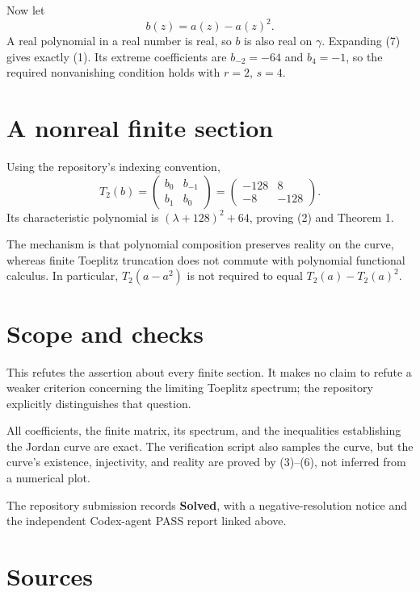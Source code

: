 \documentclass[10pt,a4paper]{article}
\begin{document}
Now let \[
 b(z)=a(z)-a(z)^2.
 \tag{7}
\] A real polynomial in a real number is real, so \(b\) is also real on
\(\gamma\). Expanding (7) gives exactly (1). Its extreme coefficients
are \(b_{-2}=-64\) and \(b_4=-1\), so the required nonvanishing
condition holds with \(r=2\), \(s=4\).

\section{A nonreal finite section}\label{a-nonreal-finite-section}

Using the repository's indexing convention, \[
 T_2(b)=\begin{pmatrix}b_0&b_{-1}\\b_1&b_0\end{pmatrix}
       =\begin{pmatrix}-128&8\\-8&-128\end{pmatrix}.
 \tag{8}
\] Its characteristic polynomial is \((\lambda+128)^2+64\), proving (2)
and Theorem 1.

The mechanism is that polynomial composition preserves reality on the
curve, whereas finite Toeplitz truncation does not commute with
polynomial functional calculus. In particular, \(T_2(a-a^2)\) is not
required to equal \(T_2(a)-T_2(a)^2\).

\section{Scope and checks}\label{scope-and-checks}

This refutes the assertion about every finite section. It makes no claim
to refute a weaker criterion concerning the limiting Toeplitz spectrum;
the repository explicitly distinguishes that question.

All coefficients, the finite matrix, its spectrum, and the inequalities
establishing the Jordan curve are exact. The verification script also
samples the curve, but the curve's existence, injectivity, and reality
are proved by (3)--(6), not inferred from a numerical plot.

The repository submission records \textbf{Solved}, with a
negative-resolution notice and the independent Codex-agent PASS report
linked above.

\section{Sources}\label{sources}
\end{document}
